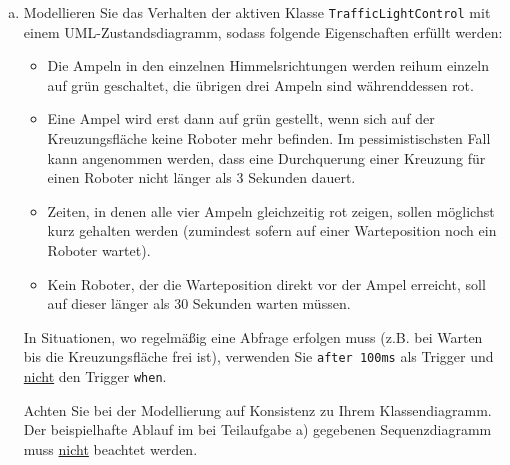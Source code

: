 
\solution{\newpage}








\begin{enumerate}[a) ,resume]
	\item Modellieren Sie das Verhalten der aktiven Klasse \texttt{TrafficLightControl} mit einem UML-Zustands\-diagramm, sodass folgende Eigenschaften erfüllt werden:
	\begin{itemize}
		\item Die Ampeln in den einzelnen Himmelsrichtungen werden reihum einzeln auf grün geschaltet, die übrigen drei Ampeln sind währenddessen rot.
		\item Eine Ampel wird erst dann auf grün gestellt, wenn sich auf der Kreuzungsfläche keine Roboter mehr befinden. Im pessimistischsten Fall kann angenommen werden, dass eine Durchquerung einer Kreuzung für einen Roboter nicht länger als 3 Sekunden dauert.
		\item Zeiten, in denen alle vier Ampeln gleichzeitig rot zeigen, sollen möglichst kurz gehalten werden (zumindest sofern auf einer Warteposition noch ein Roboter wartet).
		\item Kein Roboter, der die Warteposition direkt vor der Ampel erreicht, soll auf dieser länger als 30 Sekunden warten müssen.
	\end{itemize}

	In Situationen, wo regelmäßig eine Abfrage erfolgen muss (z.B. bei Warten bis die Kreuzungsfläche frei ist), verwenden Sie \texttt{after 100ms} als Trigger und \underline{nicht} den Trigger \texttt{when}.

	Achten Sie bei der Modellierung auf Konsistenz zu Ihrem Klassendiagramm. 
	Der beispielhafte Ablauf im bei Teilaufgabe a) gegebenen Sequenzdiagramm muss \underline{nicht} beachtet werden. 
	

\end{enumerate}
